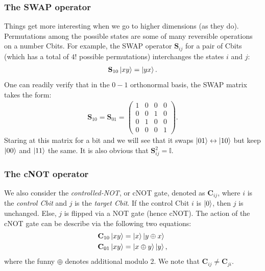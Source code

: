 \documentclass{book}
\theoremstyle{definition}
\newcommand{\nn}{\nonumber}
\newcommand{\s}{\mathbf{S}}
\begin{document}
\subsubsection{The SWAP operator}

Things get more interesting when we go to higher dimensions (as they do). Permutations among the possible states are some of many reversible operations on a number Cbits. For example, the SWAP operator $\mathbf{S}_{ij}$ for a pair of Cbits (which has a total of $4!$ possible permutations) interchanges the states $i$ and $j$:
\begin{align}
\mathbf{S}_{10}\ket{xy} = \ket{yx}.
\end{align}
One can readily verify that in the $0-1$ orthonormal basis, the SWAP matrix takes the form:
\begin{align}
\mathbf{S}_{10} = \mathbf{S}_{01} = \begin{pmatrix}
1&0&0&0\\0&0&1&0\\0&1&0&0\\0&0&0&1
\end{pmatrix}.
\end{align}
Staring at this matrix for a bit and we will see that it swaps $\ket{01} \leftrightarrow \ket{10}$ but keep $\ket{00}$ and $\ket{11}$ the same. It is also obvious that $\s_{ij}^2 = \mathbb{I}$. 

\subsubsection{The cNOT operator}

We also consider the \textit{controlled-NOT}, or cNOT gate, denoted as $\mathbf{C}_{ij}$, where $i$ is the \textit{control Cbit} and $j$ is the \textit{target Cbit}. If the control Cbit $i$ is $\ket{0}$, then $j$ is unchanged. Else, $j$ is flipped via a NOT gate (hence cNOT). The action of the cNOT gate can be describe via the following two equations:
\begin{align}
\mathbf{C}_{10}\ket{xy} &= \ket{x}\ket{y\oplus x} \nn\\
\mathbf{C}_{01}\ket{xy} &= \ket{x \oplus y}\ket{y}, 
\end{align}
where the funny $\oplus$ denotes additional modulo 2. We note that $\mathbf{C}_{ij} \neq \mathbf{C}_{ji}$. \\
\end{document}
